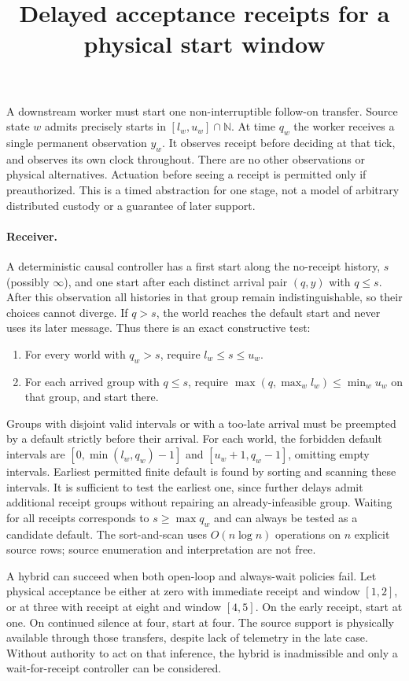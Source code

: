 \documentclass[11pt]{article}
\title{Delayed acceptance receipts for a physical start window}
\author{}\date{}
\begin{document}
\maketitle
A downstream worker must start one non-interruptible follow-on transfer.
Source state $w$ admits precisely starts in $[l_w,u_w]\cap\mathbb N$.
At time $q_w$ the worker receives a single permanent observation $y_w$.
It observes receipt before deciding at that tick, and observes its own
clock throughout. There are no other observations or physical alternatives.
Actuation before seeing a receipt is permitted only if preauthorized.
This is a timed abstraction for one stage, not a model of arbitrary
distributed custody or a guarantee of later support.

\paragraph{Receiver.}
A deterministic causal controller has a first start along the no-receipt
history, $s$ (possibly $\infty$), and one start after each distinct
arrival pair $(q,y)$ with $q\le s$. After this observation all histories
in that group remain indistinguishable, so their choices cannot diverge.
If $q>s$, the world reaches the default start and never uses its later
message. Thus there is an exact constructive test:
\begin{enumerate}
\item For every world with $q_w>s$, require $l_w\le s\le u_w$.
\item For each arrived group with $q\le s$, require
$\max(q,\max_w l_w)\le\min_w u_w$ on that group, and start there.
\end{enumerate}
Groups with disjoint valid intervals or with a too-late arrival must be
preempted by a default strictly before their arrival. For each world, the
forbidden default intervals are $[0,\min(l_w,q_w)-1]$ and
$[u_w+1,q_w-1]$, omitting empty intervals. Earliest permitted finite
default is found by sorting and scanning these intervals. It is sufficient
to test the earliest one, since further delays admit additional receipt
groups without repairing an already-infeasible group. Waiting for all
receipts corresponds to $s\ge\max q_w$ and can always be tested as a
candidate default. The sort-and-scan uses $O(n\log n)$ operations on $n$
explicit source rows; source enumeration and interpretation are not free.

A hybrid can succeed when both open-loop and always-wait policies fail.
Let physical acceptance be either at zero with immediate receipt and
window $[1,2]$, or at three with receipt at eight and window $[4,5]$.
On the early receipt, start at one. On continued silence at four, start
at four. The source support is physically available through those
transfers, despite lack of telemetry in the late case. Without authority
to act on that inference, the hybrid is inadmissible and only a
wait-for-receipt controller can be considered.
\end{document}
